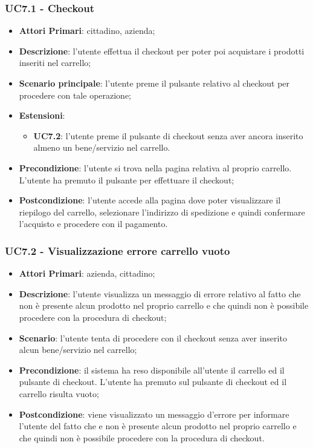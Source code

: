\subsubsection{UC7.1 - Checkout}
\begin{itemize}
	\item \textbf{Attori Primari}: cittadino, azienda;
	\item \textbf{Descrizione}: l'utente effettua il checkout per poter poi acquistare i prodotti inseriti nel carrello;
	\item \textbf{Scenario principale}: l'utente preme il pulsante relativo al checkout per procedere con tale operazione;
	\item \textbf{Estensioni}: 
	\begin{itemize}
		\item \textbf{UC7.2}: l'utente preme il pulsante di checkout senza aver ancora inserito almeno un bene/servizio nel carrello.
	\end{itemize}
	\item \textbf{Precondizione}: l'utente si trova nella pagina relativa al proprio carrello. L'utente ha premuto il pulsante per effettuare il checkout;
	\item \textbf{Postcondizione}: l'utente accede alla pagina dove poter visualizzare il riepilogo del carrello, selezionare l'indirizzo di spedizione e quindi confermare l'acquisto e procedere con il pagamento.
\end{itemize}

\subsubsection{UC7.2 - Visualizzazione errore carrello vuoto}
\begin{itemize}
	\item \textbf{Attori Primari}: azienda, cittadino;
	\item \textbf{Descrizione}:
	l'utente visualizza un messaggio di errore relativo al fatto che non è presente alcun prodotto nel proprio carrello e che quindi non è possibile procedere con la procedura di checkout;
	\item \textbf{Scenario}: l'utente tenta di procedere con il checkout senza aver inserito alcun bene/servizio nel carrello;
	\item \textbf{Precondizione}: il sistema ha reso disponibile all'utente il carrello ed il pulsante di checkout. L'utente ha premuto sul pulsante di checkout ed il carrello risulta vuoto; 
	\item \textbf{Postcondizione}: viene visualizzato un messaggio d'errore per informare l'utente del fatto che e non è presente alcun prodotto nel proprio carrello e che quindi non è possibile procedere con la procedura di checkout.
\end{itemize}

